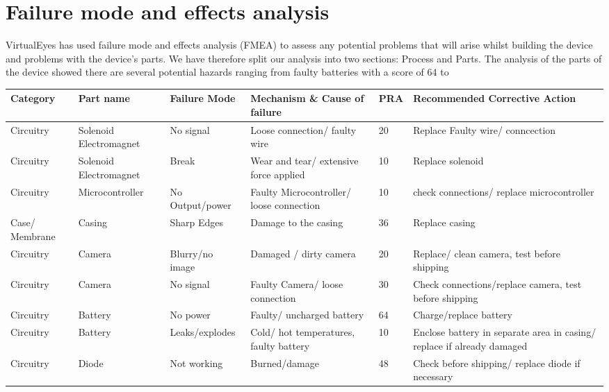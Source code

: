 \section{Failure mode and effects analysis}


VirtualEyes has used failure mode and effects analysis (FMEA) to assess any potential problems that will arise whilst building the device and problems with the device's parts. We have therefore split our analysis into two sections: Process and Parts. 
The analysis of the parts of the device showed there are several potential hazards ranging from faulty batteries with a score of 64 to 

    \begin{table}[!ht]
        \centering
        \begin{tabular}{b{1.7cm} b{2cm} b{2.5cm} b{4cm}l b{6cm}} 
            \textbf{Category} & \textbf{Part name} & \textbf{Failure Mode} & \textbf{Mechanism \& Cause of failure} & \textbf{PRA} & \textbf{Recommended Corrective Action} \\ \hline
            Circuitry & Solenoid Electromagnet & No signal & Loose connection/ faulty wire & 20 & Replace Faulty wire/ conncection \\ 
            Circuitry & Solenoid Electromagnet & Break  & Wear and tear/ extensive force applied & 10 & Replace solenoid \\ 
            Circuitry & Microcontroller & No Output/power & Faulty Microcontroller/ loose connection & 10 & check connections/ replace microcontroller \\ 
            Case/ Membrane & Casing & Sharp Edges & Damage to the casing  & 36 & Replace casing \\ 
            Circuitry & Camera & Blurry/no image & Damaged / dirty camera & 20 & Replace/ clean camera, test before shipping \\ 
            Circuitry & Camera  & No signal & Faulty Camera/ loose connection & 30 & Check connections/replace camera, test before shipping \\ 
            Circuitry & Battery & No power & Faulty/ uncharged battery & 64 & Charge/replace battery \\ 
            Circuitry & Battery & Leaks/explodes & Cold/ hot temperatures, faulty battery & 10 & Enclose battery in separate area in casing/ replace if already damaged \\ 
            Circuitry & Diode & Not working & Burned/damage & 48 & Check before shipping/ replace diode if necessary \\ 

\end{tabular}
\end{table}
